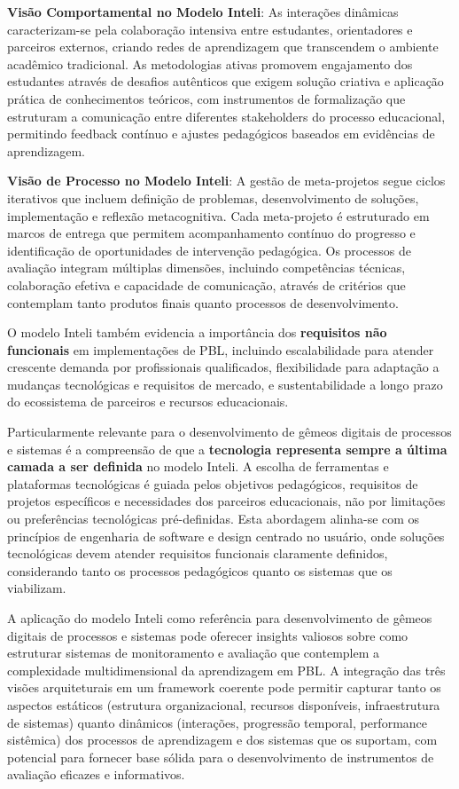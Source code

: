 \documentclass[12pt, a4paper, oneside, brazilian]{abntex2}
\begin{document}
\textbf{Visão Comportamental no Modelo Inteli}: As interações dinâmicas caracterizam-se pela colaboração intensiva entre estudantes, orientadores e parceiros externos, criando redes de aprendizagem que transcendem o ambiente acadêmico tradicional. As metodologias ativas promovem engajamento dos estudantes através de desafios autênticos que exigem solução criativa e aplicação prática de conhecimentos teóricos, com instrumentos de formalização que estruturam a comunicação entre diferentes stakeholders do processo educacional, permitindo feedback contínuo e ajustes pedagógicos baseados em evidências de aprendizagem.

\textbf{Visão de Processo no Modelo Inteli}: A gestão de meta-projetos segue ciclos iterativos que incluem definição de problemas, desenvolvimento de soluções, implementação e reflexão metacognitiva. Cada meta-projeto é estruturado em marcos de entrega que permitem acompanhamento contínuo do progresso e identificação de oportunidades de intervenção pedagógica. Os processos de avaliação integram múltiplas dimensões, incluindo competências técnicas, colaboração efetiva e capacidade de comunicação, através de critérios que contemplam tanto produtos finais quanto processos de desenvolvimento.

O modelo Inteli também evidencia a importância dos \textbf{requisitos não funcionais} em implementações de PBL, incluindo escalabilidade para atender crescente demanda por profissionais qualificados, flexibilidade para adaptação a mudanças tecnológicas e requisitos de mercado, e sustentabilidade a longo prazo do ecossistema de parceiros e recursos educacionais.

Particularmente relevante para o desenvolvimento de gêmeos digitais de processos e sistemas é a compreensão de que a \textbf{tecnologia representa sempre a última camada a ser definida} no modelo Inteli. A escolha de ferramentas e plataformas tecnológicas é guiada pelos objetivos pedagógicos, requisitos de projetos específicos e necessidades dos parceiros educacionais, não por limitações ou preferências tecnológicas pré-definidas. Esta abordagem alinha-se com os princípios de engenharia de software e design centrado no usuário, onde soluções tecnológicas devem atender requisitos funcionais claramente definidos, considerando tanto os processos pedagógicos quanto os sistemas que os viabilizam.

A aplicação do modelo Inteli como referência para desenvolvimento de gêmeos digitais de processos e sistemas pode oferecer insights valiosos sobre como estruturar sistemas de monitoramento e avaliação que contemplem a complexidade multidimensional da aprendizagem em PBL. A integração das três visões arquiteturais em um framework coerente pode permitir capturar tanto os aspectos estáticos (estrutura organizacional, recursos disponíveis, infraestrutura de sistemas) quanto dinâmicos (interações, progressão temporal, performance sistêmica) dos processos de aprendizagem e dos sistemas que os suportam, com potencial para fornecer base sólida para o desenvolvimento de instrumentos de avaliação eficazes e informativos.
\end{document}
